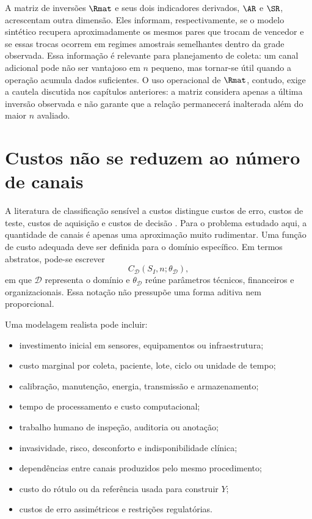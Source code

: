 A matriz de inversões $\Rmat$ e seus dois indicadores derivados, $\AR$ e $\SR$, acrescentam outra dimensão. Eles informam, respectivamente, se o modelo sintético recupera aproximadamente os mesmos pares que trocam de vencedor e se essas trocas ocorrem em regimes amostrais semelhantes dentro da grade observada. Essa informação é relevante para planejamento de coleta: um canal adicional pode não ser vantajoso em $n$ pequeno, mas tornar-se útil quando a operação acumula dados suficientes. O uso operacional de $\Rmat$, contudo, exige a cautela discutida nos capítulos anteriores: a matriz considera apenas a última inversão observada e não garante que a relação permanecerá inalterada além do maior $n$ avaliado.

\section{Custos não se reduzem ao número de canais}

A literatura de classificação sensível a custos distingue custos de erro, custos de teste, custos de aquisição e custos de decisão \cite{turney1995,turney2002}. Para o problema estudado aqui, a quantidade de canais é apenas uma aproximação muito rudimentar. Uma função de custo adequada deve ser definida para o domínio específico. Em termos abstratos, pode-se escrever
\[
C_{\mathcal{D}}(S_I,n;\theta_{\mathcal{D}}),
\]
em que $\mathcal{D}$ representa o domínio e $\theta_{\mathcal{D}}$ reúne parâmetros técnicos, financeiros e organizacionais. Essa notação não pressupõe uma forma aditiva nem proporcional.

Uma modelagem realista pode incluir:

\begin{itemize}
  \item investimento inicial em sensores, equipamentos ou infraestrutura;
  \item custo marginal por coleta, paciente, lote, ciclo ou unidade de tempo;
  \item calibração, manutenção, energia, transmissão e armazenamento;
  \item tempo de processamento e custo computacional;
  \item trabalho humano de inspeção, auditoria ou anotação;
  \item invasividade, risco, desconforto e indisponibilidade clínica;
  \item dependências entre canais produzidos pelo mesmo procedimento;
  \item custo do rótulo ou da referência usada para construir $Y$;
  \item custos de erro assimétricos e restrições regulatórias.
\end{itemize}

